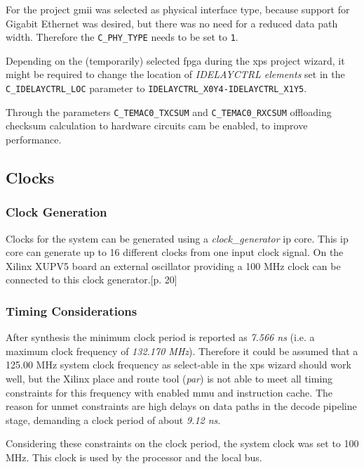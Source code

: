 For the project \gls{gmii} was selected as physical interface type, because support for Gigabit Ethernet was desired, but there was no need for a reduced data path width. Therefore the \texttt{C\_PHY\_TYPE} needs to be set to \texttt{1}.

Depending on the (temporarily) selected \gls{fpga} during the \gls{xps} project wizard, it might be required to change the location of \textit{IDELAYCTRL elements} set in the \texttt{C\_IDELAYCTRL\_LOC} parameter to \texttt{IDELAYCTRL\_X0Y4-IDELAYCTRL\_X1Y5}.

Through the parameters \texttt{C\_TEMAC0\_TXCSUM} and \texttt{C\_TEMAC0\_RXCSUM} offloading checksum calculation to hardware circuits cam be enabled, to improve performance.

\subsection{Clocks}

\subsubsection{Clock Generation}

Clocks for the system can be generated using a \textit{clock\_generator} \gls{ip} core. This \gls{ip} core can generate up to 16 different clocks from one input clock signal. On the Xilinx XUPV5 board an external oscillator providing a 100 MHz clock can be connected to this clock generator.\cite{ug347}[p. 20]

\subsubsection{Timing Considerations}

After synthesis the minimum clock period is reported as \textit{7.566 ns} (i.e. a maximum clock frequency of \textit{132.170 MHz}). Therefore it could be assumed that a 125.00 MHz system clock frequency as select-able in the \gls{xps} wizard should work well, but the Xilinx place and route tool (\textit{par}) is not able to meet all timing constraints for this frequency with enabled \gls{mmu} and instruction cache. The reason for unmet constraints are high delays on data paths in the decode pipeline stage, demanding a clock period of about \textit{9.12 ns}.

Considering these constraints on the clock period, the system clock was set to 100 MHz. This clock is used by the processor and the local bus.

